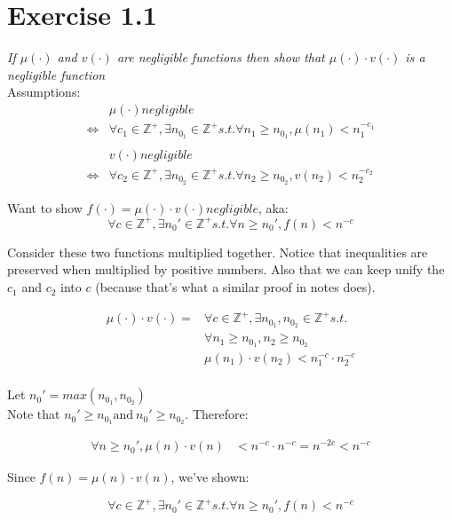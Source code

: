 \documentclass[11pt]{article}
\begin{document}
\section*{Exercise 1.1}

\textit{If $\mu(\cdot)$ and $v(\cdot)$ are negligible functions then show that $\mu(\cdot) \cdot v(\cdot)$ is a negligible function
} \\

Assumptions:
\begin{align*}
        &\mu(\cdot) negligible \\
\iff &\forall c_1 \in \mathbb{Z}^{+}, \exists n_{0_1} \in \mathbb{Z}^{+} s.t. \forall n_1 \geq n_{0_1}, \mu(n_1) < n_1^{-c_1} \\
\\
&v(\cdot) negligible \\
\iff &\forall c_2 \in \mathbb{Z}^{+}, \exists n_{0_2} \in \mathbb{Z}^{+} s.t. \forall n_2 \geq n_{0_2}, v(n_2) < n_2^{-c_2}
\end{align*}

Want to show $f(\cdot) = \mu(\cdot)\cdot v(\cdot) negligible$, aka:
$$\forall c \in \mathbb{Z}^{+}, \exists n_0' \in \mathbb{Z}^{+} s.t. \forall n \geq n_0', f(n) < n^{-c}$$

Consider these two functions multiplied together. Notice that inequalities are preserved when multiplied by positive numbers. Also that we can keep unify the $c_1$ and $c_2$ into $c$ (because that's what a similar proof in notes does).

\begin{align*}
\mu(\cdot) \cdot v(\cdot) = &\forall c \in \mathbb{Z}^{+}, \exists n_{0_1},n_{0_2} \in \mathbb{Z}^{+} s.t. \\
  &\forall n_1 \geq n_{0_1}, n_2 \geq n_{0_2} \\
  &\mu(n_1)\cdot v(n_2) < n_1^{-c}\cdot n_2^{-c} \\
\end{align*}

Let $n_0' = max(n_{0_1}, n_{0_2})$ \\
Note that $n_0' \geq n_{0_1} \text{and}\ n_0' \geq n_{0_2}$. Therefore:

\begin{align*}
\forall n \geq n_0', \mu(n)\cdot v(n) &< n^{-c}\cdot n^{-c} = n^{-2c} < n^{-c}
\end{align*}

Since $f(n) = \mu(n)\cdot v(n)$, we've shown:

$$\forall c \in \mathbb{Z}^{+}, \exists n_0' \in \mathbb{Z}^{+} s.t. \forall n \geq n_0', f(n) < n^{-c}$$
\end{document}
